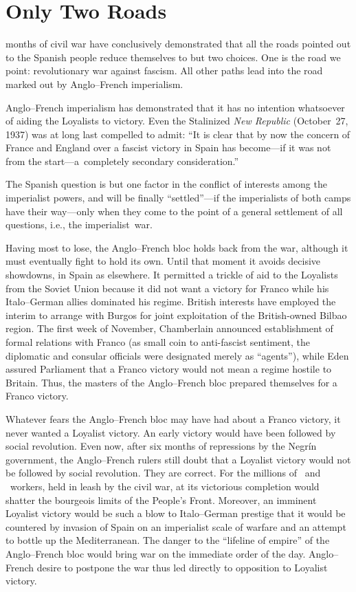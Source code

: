 \chapter{Only Two Roads}

 months of civil war have conclusively demonstrated that all the roads pointed out to the Spanish people reduce themselves to but two choices. One is the road we point: revolutionary war against fascism. All other paths lead into the road marked out by Anglo--French imperialism.

Anglo--French imperialism has demonstrated that it has no intention whatsoever of aiding the Loyalists to victory. Even the Stalinized \emph{New Republic} (October~27, 1937) was at long last compelled to admit: ``It is clear that by now the concern of France and England over a fascist victory in Spain has become—if it was not from the start—a~completely secondary consideration.''

The Spanish question is but one factor in the conflict of interests among the imperialist powers, and will be finally ``settled''—if the imperialists of both camps have their way—only when they come to the point of a general settlement of all questions, i.e., the imperialist~war.

Having most to lose, the Anglo--French bloc holds back from the war, although it must eventually fight to hold its own. Until that moment it avoids decisive showdowns, in Spain as elsewhere. It permitted a trickle of aid to the Loyalists from the Soviet Union because it did not want a victory for Franco while his Italo--German allies dominated his regime. British interests have employed the interim to arrange with Burgos for joint exploitation of the British-owned Bilbao region. The first week of November, Chamberlain announced establishment of formal relations with Franco (as small coin to anti-fascist sentiment, the diplomatic and consular officials were designated merely as ``agents''), while Eden assured Parliament that a Franco victory would not mean a regime hostile to Britain. Thus, the masters of the Anglo--French bloc prepared themselves for a Franco victory.

Whatever fears the Anglo--French bloc may have had about a Fran\-co victory, it never wanted a Loyalist victory. An early victory would have been followed by social revolution. Even now, after six months of repressions by the Negr\'in government, the Anglo--French rulers still doubt that a Loyalist victory would not be followed by social revolution. They are correct. For the millions of \CNT\ and \UGT\ workers, held in leash by the civil war, at its victorious completion would shatter the bourgeois limits of the People’s Front. Moreover, an imminent Loyalist victory would be such a blow to Italo--German prestige that it would be countered by invasion of Spain on an imperialist scale of warfare and an attempt to bottle up the Mediterranean. The danger to the ``lifeline of empire'' of the Anglo--French bloc would bring war on the immediate order of the day. Anglo--French desire to postpone the war thus led directly to opposition to Loyalist victory.

